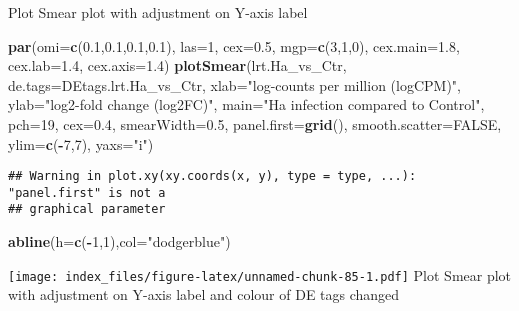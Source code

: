 \documentclass[
]{article}
\newenvironment{Shaded}{\begin{snugshade}}{\end{snugshade}}
\newcommand{\AttributeTok}[1]{\textcolor[rgb]{0.13,0.29,0.53}{#1}}
\newcommand{\ConstantTok}[1]{\textcolor[rgb]{0.56,0.35,0.01}{#1}}
\newcommand{\DecValTok}[1]{\textcolor[rgb]{0.00,0.00,0.81}{#1}}
\newcommand{\FloatTok}[1]{\textcolor[rgb]{0.00,0.00,0.81}{#1}}
\newcommand{\FunctionTok}[1]{\textcolor[rgb]{0.13,0.29,0.53}{\textbf{#1}}}
\newcommand{\NormalTok}[1]{#1}
\newcommand{\SpecialCharTok}[1]{\textcolor[rgb]{0.81,0.36,0.00}{\textbf{#1}}}
\newcommand{\StringTok}[1]{\textcolor[rgb]{0.31,0.60,0.02}{#1}}
\begin{document}
Plot Smear plot with adjustment on Y-axis label

\begin{Shaded}
\begin{Highlighting}[]
\FunctionTok{par}\NormalTok{(}\AttributeTok{omi=}\FunctionTok{c}\NormalTok{(}\FloatTok{0.1}\NormalTok{,}\FloatTok{0.1}\NormalTok{,}\FloatTok{0.1}\NormalTok{,}\FloatTok{0.1}\NormalTok{), }\AttributeTok{las=}\DecValTok{1}\NormalTok{, }\AttributeTok{cex=}\FloatTok{0.5}\NormalTok{, }\AttributeTok{mgp=}\FunctionTok{c}\NormalTok{(}\DecValTok{3}\NormalTok{,}\DecValTok{1}\NormalTok{,}\DecValTok{0}\NormalTok{), }\AttributeTok{cex.main=}\FloatTok{1.8}\NormalTok{, }\AttributeTok{cex.lab=}\FloatTok{1.4}\NormalTok{, }\AttributeTok{cex.axis=}\FloatTok{1.4}\NormalTok{)}
\FunctionTok{plotSmear}\NormalTok{(lrt.Ha\_vs\_Ctr, }\AttributeTok{de.tags=}\NormalTok{DEtags.lrt.Ha\_vs\_Ctr, }\AttributeTok{xlab=}\StringTok{"log{-}counts per million (logCPM)"}\NormalTok{, }\AttributeTok{ylab=}\StringTok{"log2{-}fold change (log2FC)"}\NormalTok{, }\AttributeTok{main=}\StringTok{"Ha infection compared to Control"}\NormalTok{, }\AttributeTok{pch=}\DecValTok{19}\NormalTok{, }\AttributeTok{cex=}\FloatTok{0.4}\NormalTok{, }\AttributeTok{smearWidth=}\FloatTok{0.5}\NormalTok{, }\AttributeTok{panel.first=}\FunctionTok{grid}\NormalTok{(), }\AttributeTok{smooth.scatter=}\ConstantTok{FALSE}\NormalTok{, }\AttributeTok{ylim=}\FunctionTok{c}\NormalTok{(}\SpecialCharTok{{-}}\DecValTok{7}\NormalTok{,}\DecValTok{7}\NormalTok{), }\AttributeTok{yaxs=}\StringTok{"i"}\NormalTok{)}
\end{Highlighting}
\end{Shaded}

\begin{verbatim}
## Warning in plot.xy(xy.coords(x, y), type = type, ...): "panel.first" is not a
## graphical parameter
\end{verbatim}

\begin{Shaded}
\begin{Highlighting}[]
\FunctionTok{abline}\NormalTok{(}\AttributeTok{h=}\FunctionTok{c}\NormalTok{(}\SpecialCharTok{{-}}\DecValTok{1}\NormalTok{,}\DecValTok{1}\NormalTok{),}\AttributeTok{col=}\StringTok{"dodgerblue"}\NormalTok{)}
\end{Highlighting}
\end{Shaded}

\texttt{[image: index\_files/figure-latex/unnamed-chunk-85-1.pdf]} Plot
Smear plot with adjustment on Y-axis label and colour of DE tags changed
\end{document}
